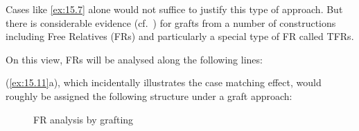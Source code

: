 \documentclass[output=paper]{langsci/langscibook}
\begin{document}
\begin{refcontext}
Cases like \eqref{ex:15.7} alone would not suffice to justify this type of approach. But
there is considerable evidence
(cf.~\citealt{VanRiemsdijk2001,VanRiemsdijk2006a,VanRiemsdijk2006b,VanRiemsdijk2006c,VanRiemsdijk2010})
for grafts from a number of constructions including Free Relatives (\glspl{FR})
and particularly a special type of FR called \glspl{TFR}.

On this view, \glspl{FR} will be analysed along the following
lines:

\ea\label{ex:15.11}
    \z
\z
(\ref{ex:15.11}a), which incidentally illustrates the case matching effect, would roughly
be assigned the following structure under a graft approach:


\begin{figure}\caption{\label{fig:ex:15.12}\gls{FR} analysis by grafting}
\end{figure}
\end{refcontext}
\end{document}
